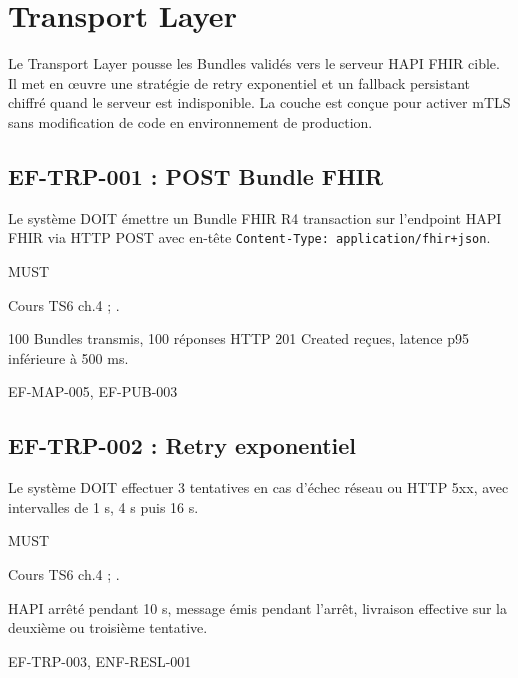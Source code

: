 \section{Transport Layer}
\label{sec:ef-transport}

Le Transport Layer pousse les Bundles validés vers le serveur HAPI FHIR cible. Il met en œuvre une stratégie de retry exponentiel et un fallback persistant chiffré quand le serveur est indisponible. La couche est conçue pour activer mTLS sans modification de code en environnement de production.

\subsection*{EF-TRP-001 : POST Bundle FHIR}
\begin{description}[leftmargin=2.5cm, style=nextline]
  \item[Énoncé] Le système DOIT émettre un Bundle FHIR R4 transaction sur l'endpoint HAPI FHIR via HTTP POST avec en-tête \texttt{Content-Type: application/fhir+json}.
  \item[Priorité] MUST
  \item[Source] Cours TS6 ch.4 ; \cite{hl7_fhir_r4}.
  \item[Recette] 100 Bundles transmis, 100 réponses HTTP 201 Created reçues, latence p95 inférieure à 500 ms.
  \item[Lié à] EF-MAP-005, EF-PUB-003
\end{description}

\subsection*{EF-TRP-002 : Retry exponentiel}
\begin{description}[leftmargin=2.5cm, style=nextline]
  \item[Énoncé] Le système DOIT effectuer 3 tentatives en cas d'échec réseau ou HTTP 5xx, avec intervalles de 1 s, 4 s puis 16 s.
  \item[Priorité] MUST
  \item[Source] Cours TS6 ch.4 ; \cite{ihe_pcd_tf}.
  \item[Recette] HAPI arrêté pendant 10 s, message émis pendant l'arrêt, livraison effective sur la deuxième ou troisième tentative.
  \item[Lié à] EF-TRP-003, ENF-RESL-001
\end{description}

